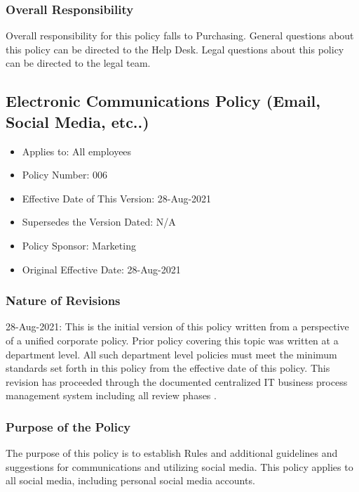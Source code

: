 \documentclass[stu]{apa7}
\begin{document}
\subsubsection{Overall Responsibility}
\label{sec:org720ea7a}

Overall responsibility for this policy falls to Purchasing. General questions about this policy can be directed to the Help Desk. Legal questions about this policy can be directed to the legal team.

\subsection{Electronic Communications Policy (Email, Social Media, etc..)}
\label{sec:org208f23a}

\begin{itemize}
\item Applies to: All employees
\item Policy Number: 006
\item Effective Date of This Version: 28-Aug-2021
\item Supersedes the Version Dated: N/A
\item Policy Sponsor: Marketing
\item Original Effective Date: 28-Aug-2021
\end{itemize}

\subsubsection{Nature of Revisions}
\label{sec:org1ab09fa}

28-Aug-2021: This is the initial version of this policy written from a perspective of a unified corporate policy. Prior policy covering this topic was written at a department level. All such department level policies must meet the minimum standards set forth in this policy from the effective date of this policy. This revision has proceeded through the documented centralized IT business process management system including all review phases \cite{wagleDevelopmentEffectiveCentralized2021}.

\subsubsection{Purpose of the Policy}
\label{sec:org6746b90}

The purpose of this policy is to establish Rules and additional guidelines and suggestions for communications and utilizing social media. This policy applies to all social media, including personal social media accounts.
\end{document}
